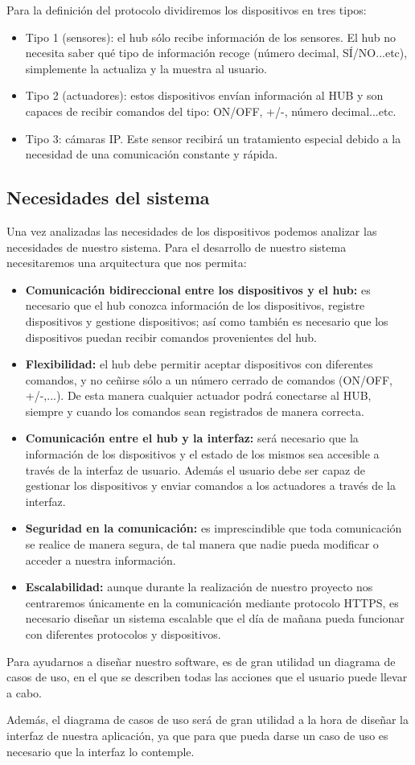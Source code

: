 Para la definición del protocolo dividiremos los dispositivos en tres tipos:
\begin{itemize}
\setlength\itemsep{6pt plus 1pt minus 1pt}
\item Tipo 1 (sensores): el hub sólo recibe información de los sensores. El hub no necesita saber qué tipo de información recoge (número decimal, SÍ/NO...etc), simplemente la actualiza y la muestra al usuario.
\item Tipo 2 (actuadores): estos dispositivos envían información al HUB y son capaces de recibir comandos del tipo: ON/OFF, +/-, número decimal...etc.
\item Tipo 3: cámaras IP. Este sensor recibirá un tratamiento especial debido a la necesidad de una comunicación constante y rápida.
\end{itemize}
\subsection{Necesidades del sistema}
Una vez analizadas las necesidades de los dispositivos podemos analizar las necesidades de nuestro sistema.
Para el desarrollo de nuestro sistema necesitaremos una arquitectura que nos permita:
\begin{itemize}
\setlength\itemsep{6pt plus 1pt minus 1pt}
\item \textbf{Comunicación bidireccional entre los dispositivos y el hub:} es necesario que el hub conozca información de los dispositivos, 
registre dispositivos y gestione dispositivos; así como también es necesario que los dispositivos puedan recibir comandos provenientes
del hub.
\item \textbf{Flexibilidad:} el hub debe permitir aceptar dispositivos con diferentes comandos, y no ceñirse sólo a un número cerrado de comandos (ON/OFF, +/-,...).
De esta manera cualquier actuador podrá conectarse al HUB, siempre y cuando los comandos sean registrados de manera correcta.
\item \textbf{Comunicación entre el hub y la interfaz:} será necesario que la información de los dispositivos y el estado de los mismos sea accesible
a través de la interfaz de usuario. Además el usuario debe ser capaz de gestionar los dispositivos y enviar comandos a los actuadores
a través de la interfaz.
\item \textbf{Seguridad en la comunicación:} es imprescindible que toda comunicación se realice de manera segura, de tal manera que nadie pueda modificar o
acceder a nuestra información.
\item \textbf{Escalabilidad:} aunque durante la realización de nuestro proyecto nos centraremos únicamente en la comunicación mediante protocolo HTTPS, 
es necesario diseñar un sistema escalable que el día de mañana pueda funcionar con diferentes protocolos y dispositivos.
\end{itemize}
Para ayudarnos a diseñar nuestro software, es de gran utilidad un diagrama de casos de uso, en el que se describen
todas las acciones que el usuario puede llevar a cabo.
\par
Además, el diagrama de casos de uso será de gran utilidad a la hora de diseñar la interfaz de nuestra aplicación, ya que para que pueda 
darse un caso de uso es necesario que la interfaz lo contemple.
